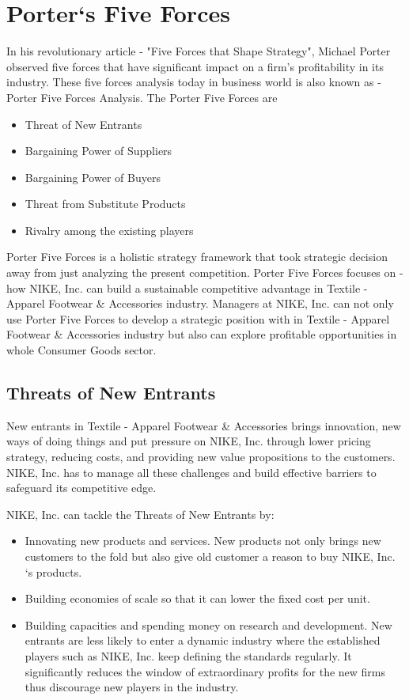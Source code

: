 \documentclass[a4paper, 12pt]{report}
\begin{document}
\section{Porter‘s Five Forces}
In his revolutionary article - "Five Forces that Shape Strategy", Michael Porter observed five forces that have significant impact on a firm's profitability in its industry. These five forces analysis today in business world is also known as -Porter Five Forces Analysis. The Porter Five Forces are 
\begin{itemize}
    \item Threat of New Entrants
    \item Bargaining Power of Suppliers
    \item Bargaining Power of Buyers
    \item Threat from Substitute Products
    \item Rivalry among the existing players

\end{itemize}
Porter Five Forces is a holistic strategy framework that took strategic decision away from just analyzing the present competition. Porter Five Forces focuses on - how NIKE, Inc. can build a sustainable competitive advantage in Textile - Apparel Footwear \& Accessories industry. Managers at NIKE, Inc. can not only use Porter Five Forces to develop a strategic position with in Textile - Apparel Footwear \& Accessories industry but also can explore profitable opportunities in whole Consumer Goods sector.
\subsection{Threats of New Entrants}
New entrants in Textile - Apparel Footwear & Accessories brings innovation, new ways of doing things and put pressure on NIKE, Inc. through lower pricing strategy, reducing  costs, and providing new value propositions to the customers. NIKE, Inc. has to manage all these challenges and build effective barriers to safeguard its competitive edge.\par
NIKE, Inc. can tackle the Threats of New Entrants by:
\begin{itemize}
    \item Innovating new products and services. New products not only brings new customers to the fold but also give old customer a reason to buy NIKE, Inc. ‘s products.
    \item Building economies of scale so that it can lower the fixed cost per unit. 
    \item Building capacities and spending money on research and development. New entrants are less likely to enter a dynamic industry where the established players such as NIKE, Inc. keep defining the standards regularly. It significantly reduces the window of extraordinary profits for the new firms thus discourage new players in the industry.

\end{itemize}
\end{document}
